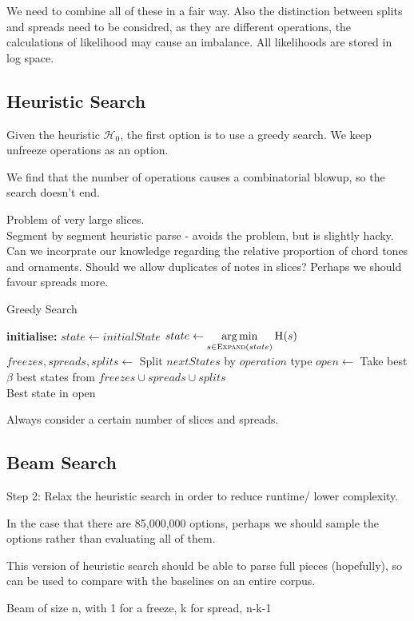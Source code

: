 \documentclass[12pt,a4paper,twoside,openright]{report} \usepackage[pdfborder={0 0 0}]{hyperref}    %
\theoremstyle{definition} \newtheorem{definition}{Definition}[section]
\begin{document}
    We need to combine all of these in a fair way. Also the distinction between splits and spreads need to be considred,
    as they are different operations, the calculations of likelihood may cause an imbalance. All likelihoods are stored
    in log space.

    \FloatBarrier \subsection{Heuristic Search} Given the heuristic $\mathcal{H}_0$, the first option is to use a greedy
    search. We keep unfreeze operations as an option.

    We find that the number of operations causes a combinatorial blowup, so the search doesn't end.

    Problem of very large slices.\\ Segment by segment heuristic parse - avoids the problem, but is slightly hacky. Can
    we incorprate our knowledge regarding the relative proportion of chord tones and ornaments. Should we allow
    duplicates of notes in slices? Perhaps we should favour spreads more. 

    \begin{algorithm}[h] \caption{Greedy Search} \label{code:stbs0} \begin{algorithmic} \State \textbf{initialise:
      } $state \gets initialState$  \State $state \gets \argmin\limits_{s \in
      \Call{Expand}{state}} \Call{H}{s} $ \State $freezes, spreads, splits \gets $ Split $nextStates$ by $operation$
      type \State $open \gets $ Take best $\beta$ best states from $freezes \cup spreads \cup splits$ \EndWhile \\
    \Return Best state in open \end{algorithmic} \end{algorithm}

    Always consider a certain number of slices and spreads.

    \subsection{Beam Search} Step 2: Relax the heuristic search in order to reduce runtime/ lower complexity. \par In
    the case that there are 85,000,000 options, perhaps we should sample the options rather than evaluating all of them.
    \par This version of heuristic search should be able to parse full pieces (hopefully), so can be used to compare
    with the baselines on an entire corpus. \par Beam of size n, with 1 for a freeze, k for spread, n-k-1 
\end{document}
